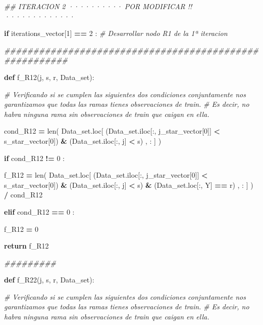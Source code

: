 \documentclass[
  11pt,
  a4paper,
]{article}
\newenvironment{Shaded}{\begin{snugshade}}{\end{snugshade}}
\newcommand{\BuiltInTok}[1]{#1}
\newcommand{\CommentTok}[1]{\textcolor[rgb]{0.56,0.35,0.01}{\textit{#1}}}
\newcommand{\ControlFlowTok}[1]{\textcolor[rgb]{0.13,0.29,0.53}{\textbf{#1}}}
\newcommand{\DecValTok}[1]{\textcolor[rgb]{0.00,0.00,0.81}{#1}}
\newcommand{\KeywordTok}[1]{\textcolor[rgb]{0.13,0.29,0.53}{\textbf{#1}}}
\newcommand{\NormalTok}[1]{#1}
\newcommand{\OperatorTok}[1]{\textcolor[rgb]{0.81,0.36,0.00}{\textbf{#1}}}
\newcommand{\StringTok}[1]{\textcolor[rgb]{0.31,0.60,0.02}{#1}}
\begin{document}
\begin{Shaded}
\begin{Highlighting}[]
    \CommentTok{\#\# ITERACION 2   ·········· POR MODIFICAR !! ·············}

    \ControlFlowTok{if}\NormalTok{ iterations\_vector[}\DecValTok{1}\NormalTok{] }\OperatorTok{==} \DecValTok{2}\NormalTok{ :  }\CommentTok{\# Desarrollar nodo R1 de la 1ª iteracion}

        \CommentTok{\#\#\#\#\#\#\#\#\#\#\#\#\#\#\#\#\#\#\#\#\#\#\#\#\#\#\#\#\#\#\#\#\#\#\#\#\#\#\#\#\#\#\#\#\#\#\#\#\#\#\#\#\#\#\#}


        \KeywordTok{def}\NormalTok{ f\_R12(j, s, r, Data\_set):}

           \CommentTok{\# Verificando si se cumplen las siguientes dos condiciones conjuntamente nos garantizamos que todas las ramas tienes observaciones de train. }
           \CommentTok{\# Es decir, no habra ninguna rama sin observaciones de train que caigan en ella.}

\NormalTok{            cond\_R12 }\OperatorTok{=} \BuiltInTok{len}\NormalTok{( Data\_set.loc[ (Data\_set.iloc[:, j\_star\_vector[}\DecValTok{0}\NormalTok{]] }\OperatorTok{\textless{}}\NormalTok{ s\_star\_vector[}\DecValTok{0}\NormalTok{]) }\OperatorTok{\&}\NormalTok{ (Data\_set.iloc[:, j] }\OperatorTok{\textless{}}\NormalTok{ s) , : ] ) }

            \ControlFlowTok{if}\NormalTok{  cond\_R12 }\OperatorTok{!=} \DecValTok{0}\NormalTok{ :}

\NormalTok{                f\_R12 }\OperatorTok{=} \BuiltInTok{len}\NormalTok{( Data\_set.loc[ (Data\_set.iloc[:, j\_star\_vector[}\DecValTok{0}\NormalTok{]] }\OperatorTok{\textless{}}\NormalTok{ s\_star\_vector[}\DecValTok{0}\NormalTok{]) }\OperatorTok{\&}\NormalTok{ (Data\_set.iloc[:, j] }\OperatorTok{\textless{}}\NormalTok{ s) }\OperatorTok{\&}\NormalTok{ (Data\_set.loc[:, }\StringTok{\textquotesingle{}Y\textquotesingle{}}\NormalTok{] }\OperatorTok{==}\NormalTok{ r) , : ] ) }\OperatorTok{/}\NormalTok{ cond\_R12}

            
            \ControlFlowTok{elif}\NormalTok{ cond\_R12 }\OperatorTok{==} \DecValTok{0}\NormalTok{ :}

\NormalTok{                f\_R12 }\OperatorTok{=} \DecValTok{0}

            
            \ControlFlowTok{return}\NormalTok{ f\_R12 }

        \CommentTok{\#\#\#\#\#\#\#\#\#}

        \KeywordTok{def}\NormalTok{ f\_R22(j, s, r, Data\_set):}

           \CommentTok{\# Verificando si se cumplen las siguientes dos condiciones conjuntamente nos garantizamos que todas las ramas tienes observaciones de train. }
           \CommentTok{\# Es decir, no habra ninguna rama sin observaciones de train que caigan en ella.}


\end{Highlighting}
\end{Shaded}
\end{document}
